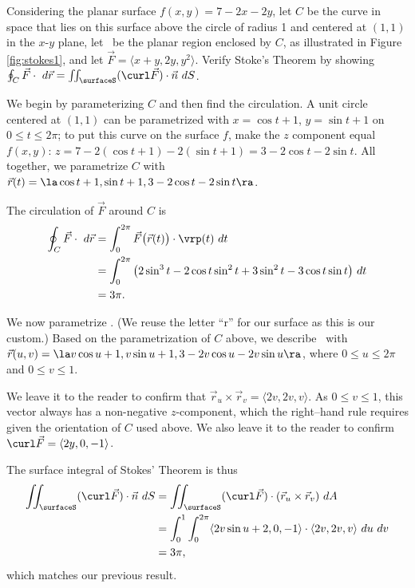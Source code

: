 {Considering the planar surface $f(x,y) = 7-2x-2y$, let $C$ be the curve in space that lies on this surface above the circle of radius 1 and centered at $(1,1)$ in the $x$-$y$ plane, let \surfaceS\ be the planar region enclosed by $C$, as illustrated in Figure \ref{fig:stokes1}, and let $\vec F = \langle x+y,2y, y^2\rangle$. Verify Stoke's Theorem by showing $\oint_C \vec F\cdot \ d\vec r = \iint_\surfaceS (\curl\vec F)\cdot \vec n\ dS$.
}
{We begin by parameterizing $C$ and then find the circulation. A unit circle centered at $(1,1)$ can be parametrized with $x=\cos t+1$, $y=\sin t+1$ on $0\leq t\leq 2\pi$; to put this curve on the surface $f$, make the $z$ component equal $f(x,y)$: $z = 7-2(\cos t+1)-2(\sin t+1)  = 3-2\cos t - 2\sin t$. All together, we parametrize $C$ with $\vec r(t) = \la \cos t+1, \sin t+1, 3-2\cos t-2\sin t\ra$. 
\enlargethispage{3\baselineskip}

The circulation of $\vec F$ around $C$ is
\begin{align*}
\oint_C\vec F\cdot \ d\vec r &= \int_0^{2\pi}\vec F\big(\vec r(t)\big)\cdot \vrp(t)\ dt \\%
	&= \int_0^{2\pi}\big(2\sin^3t-2\cos t\sin^2t+3\sin^2t-3\cos t\sin t\big)\ dt \\
	&= 3\pi.
	\end{align*}

We now parametrize \surfaceS. (We reuse the letter ``r'' for our surface as this is our custom.) Based on the parametrization of $C$ above, we describe \surfaceS\ with $\vec r(u,v) = \la v\cos u+1, v\sin u+1, 3-2v\cos u-2v\sin u\ra$, where $0\leq u\leq 2\pi$ and $0\leq v\leq 1$. 

We leave it to the reader to confirm that $\vec r_u\times \vec r_v = \langle 2v,2v,v\rangle$. As $0\leq v\leq 1$, this vector always has a non-negative $z$-component, which the right--hand rule requires given the orientation of $C$ used above. We also leave it to the reader to confirm $\curl\vec F = \langle 2y,0,-1\rangle$.

The surface integral of Stokes' Theorem is thus
\begin{align*}
\iint_\surfaceS (\curl\vec F)\cdot \vec n\ dS &= \iint_\surfaceS (\curl\vec F)\cdot (\vec r_u\times \vec r_v)\ dA \\
	&= \int_0^1\int_0^{2\pi} \langle 2v\sin u+2,0,-1\rangle\cdot\langle 2v,2v,v\rangle\ du\ dv\\
	&= 3\pi,
\end{align*}
which matches our previous result.
}\\

